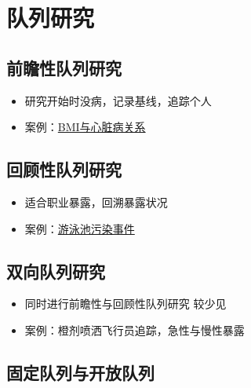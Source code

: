 \documentclass[]{book}
\providecommand{\tightlist}{%
  \setlength{\itemsep}{0pt}\setlength{\parskip}{0pt}}
\begin{document}
\hypertarget{ux961fux5217ux7814ux7a76}{%
\section{队列研究}\label{ux961fux5217ux7814ux7a76}}

\hypertarget{ux524dux77bbux6027ux961fux5217ux7814ux7a76}{%
\subsection{前瞻性队列研究}\label{ux524dux77bbux6027ux961fux5217ux7814ux7a76}}

\begin{itemize}
\tightlist
\item
  研究开始时没病，记录基线，追踪个人
\item
  案例：\href{http://www.ncbi.nlm.nih.gov/pubmed/7654270}{BMI与心脏病关系}
\end{itemize}

\hypertarget{ux56deux987eux6027ux961fux5217ux7814ux7a76}{%
\subsection{回顾性队列研究}\label{ux56deux987eux6027ux961fux5217ux7814ux7a76}}

\begin{itemize}
\tightlist
\item
  适合职业暴露，回溯暴露状况
\item
  案例：\href{http://www.cdc.gov/parasites/giardia/}{游泳池污染事件}
\end{itemize}

\hypertarget{ux53ccux5411ux961fux5217ux7814ux7a76}{%
\subsection{双向队列研究}\label{ux53ccux5411ux961fux5217ux7814ux7a76}}

\begin{itemize}
\tightlist
\item
  同时进行前瞻性与回顾性队列研究 较少见
\item
  案例：橙剂喷洒飞行员追踪，急性与慢性暴露
\end{itemize}

\hypertarget{ux56faux5b9aux961fux5217ux4e0eux5f00ux653eux961fux5217}{%
\subsection{固定队列与开放队列}\label{ux56faux5b9aux961fux5217ux4e0eux5f00ux653eux961fux5217}}
\end{document}
